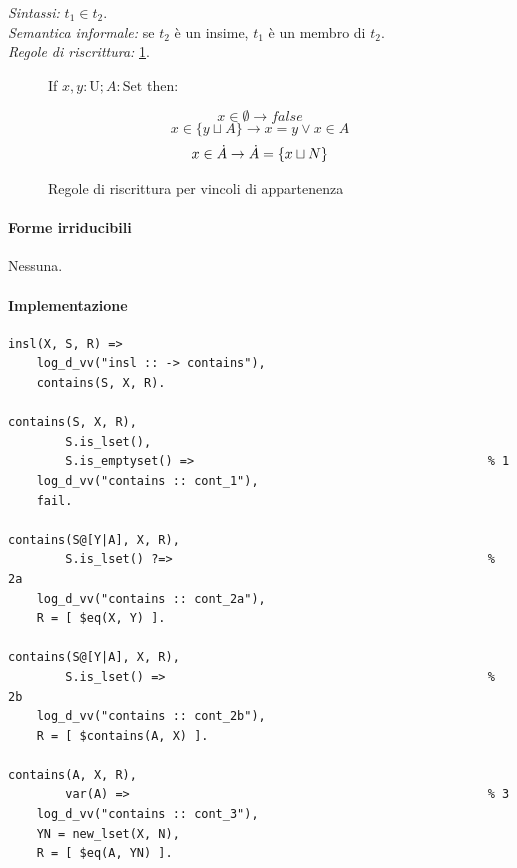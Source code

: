 \documentclass[12pt,a4paper,openright]{book} %
\begin{document}
\textit{Sintassi:} $t_1 \in t_2$.\\
\noindent\textit{Semantica informale:} se $t_2$ è un insime, $t_1$ è un membro di $t_2$.\\
\noindent\textit{Regole di riscrittura:} \ref{fig:in_constraints}.

\begin{figure}[H]
	\label{fig:in_constraints}
	
	\begin{tcolorbox}[colframe=black, colback=white, sharp corners]
		\setcounter{equation}{0}
		\renewcommand{\theequation}{$\in$\textsubscript{\arabic{equation}}}
		
		If $x, y: \text{U}; A: \text{Set}$ then:
		
		\begin{equation}
		x \in \emptyset \to false
		\end{equation}
		\begin{equation}
		x \in \{ y \sqcup A \} \to x = y \lor x \in A
		\end{equation}
		\begin{equation}
		x \in \dot{A} \to \dot{A} = \{ x \sqcup N \}
		\end{equation}
		
	\end{tcolorbox}
	
	\caption{Regole di riscrittura per vincoli di appartenenza}
\end{figure}

\paragraph{Forme irriducibili} Nessuna.

\paragraph{Implementazione}
\begin{verbatim}
insl(X, S, R) => 
    log_d_vv("insl :: -> contains"),
    contains(S, X, R).

contains(S, X, R),
        S.is_lset(),
        S.is_emptyset() =>                                         % 1
    log_d_vv("contains :: cont_1"),
    fail.

contains(S@[Y|A], X, R),
        S.is_lset() ?=>                                            % 2a
    log_d_vv("contains :: cont_2a"),
    R = [ $eq(X, Y) ].

contains(S@[Y|A], X, R),
        S.is_lset() =>                                             % 2b
    log_d_vv("contains :: cont_2b"),
    R = [ $contains(A, X) ].

contains(A, X, R),
        var(A) =>                                                  % 3
    log_d_vv("contains :: cont_3"),
    YN = new_lset(X, N),
    R = [ $eq(A, YN) ].
\end{verbatim}
\end{document}
